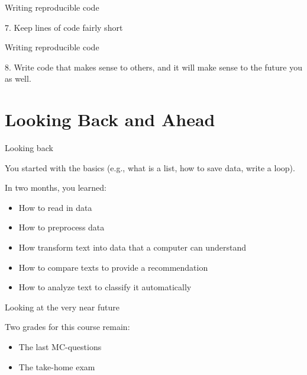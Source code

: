\documentclass[compress]{beamer}
\begin{document}
\begin{frame}{Writing reproducible code}
	
	7. Keep lines of code fairly short
	
	
\end{frame}


\begin{frame}{Writing reproducible code}
	
	8. Write code that makes sense to others, and it will make sense to the future you as well.
	
\end{frame}



\section{Looking Back and Ahead}

\begin{frame}{Looking back} 
	
	You started with the basics (e.g., what is a list, how to save data, write a loop).\\
	\begin{alertblock}{In two months, you learned:}
		\begin{itemize}
			\item How to read in data
			\item How to preprocess data
			\item How transform text into data that a computer can understand
			\item How to compare texts to provide a recommendation
			\item How to analyze text to classify it automatically		
		\end{itemize}
	\end{alertblock}	
\end{frame}


\begin{frame}{Looking at the very near future} 
	
	\begin{alertblock}{Two grades for this course remain:}
		\begin{itemize}
			\item The last MC-questions 
			\item The take-home exam 
		\end{itemize}
	\end{alertblock}	
\end{frame}
\end{document}
